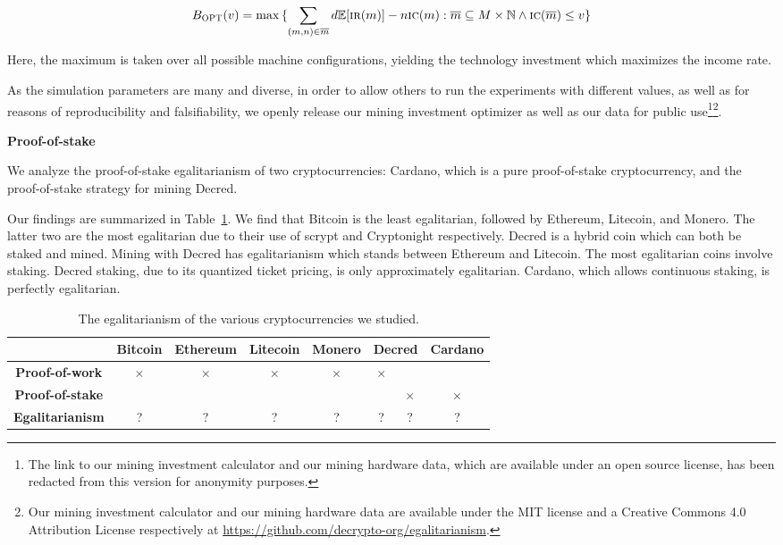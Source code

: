 \[
  B_\textsc{OPT}(v)
  =
  \max{
    \{
      \sum_{(m, n) \in \overline{m}}
      {d\mathbb{E}[\textsc{ir}(m)] - n\textsc{ic}(m)}:
      \overline{m} \subseteq M \times \mathbb{N}
      \land
      \textsc{ic}(\overline{m}) \leq v
    \}
  }
\]

Here, the maximum is taken over all possible machine configurations, yielding
the technology investment which maximizes the income rate.

As the simulation parameters are many and diverse, in order to allow others to
run the experiments with different values, as well as for reasons of
reproducibility and falsifiability, we openly release our mining investment
optimizer as well as our data for public use\ifanonymous\footnote{
  The link to our mining investment calculator and our mining hardware data,
  which are available under an open source license, has been redacted from this
  version for anonymity purposes.
}\else\footnote{
  Our mining investment calculator and our mining hardware data are available
  under the MIT license and a Creative Commons 4.0 Attribution License
  respectively at \url{https://github.com/decrypto-org/egalitarianism}.
}\fi.

\noindent\textbf{Proof-of-stake}

\noindent
We analyze the proof-of-stake egalitarianism of two cryptocurrencies: Cardano,
which is a pure proof-of-stake cryptocurrency, and the proof-of-stake strategy
for mining Decred.

Our findings are summarized in Table~\ref{tbl:egalitarianism}. We find that
Bitcoin is the least egalitarian, followed by Ethereum, Litecoin, and Monero.
The latter two are the most egalitarian due to their use of scrypt and
Cryptonight respectively. Decred is a hybrid coin which can both be staked and
mined. Mining with Decred has egalitarianism which stands between Ethereum and
Litecoin. The most egalitarian coins involve staking. Decred staking, due to its
quantized ticket pricing, is only approximately egalitarian. Cardano, which
allows continuous staking, is perfectly egalitarian.


\begin{table}
  \centering
  \begin{tabular}{|c|c|c|c|c|c|c|c|}
    \hline
    & Bitcoin & Ethereum & Litecoin & Monero & \multicolumn{2}{c|}{Decred} & Cardano\\
    \hline
    \textbf{Proof-of-work} &
    $\times$ & $\times$ & $\times$ & $\times$ & $\times$ & & \\
    \hline
    \textbf{Proof-of-stake} &
    & & & & & $\times$ & $\times$ \\
    \hline
    \textbf{Egalitarianism} &
    ? & ? & ? & ? & ? & ? & ? \\
    \hline
  \end{tabular}
  \caption{The egalitarianism of the various cryptocurrencies we studied.}
  \label{tbl:egalitarianism}
\end{table}


